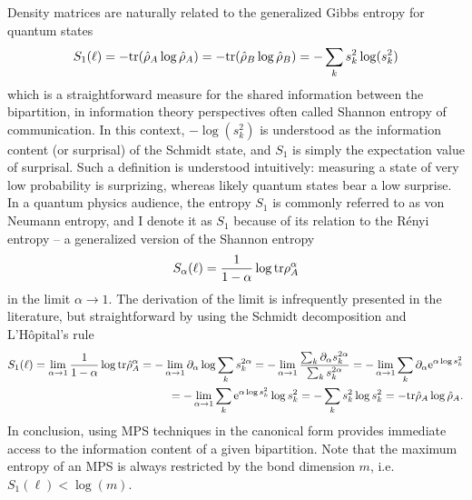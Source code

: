 Density matrices are naturally related to the generalized Gibbs entropy for quantum states
\begin{align}
    S_1(\ell) = -{\rm tr}(\hat\rho_A\log\hat\rho_A) = -{\rm tr}(\hat\rho_B\log\hat\rho_B) = -\sum_k s^2_k\log(s^2_k)
\end{align}
which is a straightforward measure for the shared information between the bipartition, in information theory perspectives often called Shannon entropy of communication.
In this context, $-\log(s^2_k)$ is understood as the information content (or surprisal) of the Schmidt state, and $S_1$ is simply the expectation value of surprisal.
Such a definition is understood intuitively: measuring a state of very low probability is surprizing, whereas likely quantum states bear a low surprise.
In a quantum physics audience, the entropy $S_1$ is commonly referred to as von Neumann entropy, and I denote it as $S_1$ because of its relation to the Rényi entropy -- a generalized version of the Shannon entropy
\begin{align}
    S_\alpha(\ell) = \frac{1}{1-\alpha}\log{\rm tr}\rho^\alpha_A
\end{align}
in the limit $\alpha\rightarrow1$.
The derivation of the limit is infrequently presented in the literature, but straightforward by using the Schmidt decomposition and L'Hôpital's rule
\begin{align}
    S_1(\ell)
    =
    \lim_{\alpha\rightarrow1}\frac1{1-\alpha}\log{\rm tr}\hat\rho_A^\alpha
    =
    -\lim_{\alpha\rightarrow1}\partial_\alpha\log\sum_k s_k^{2\alpha}
    =
    -\lim_{\alpha\rightarrow1}\frac{\sum_k\partial_\alpha s_k^{2\alpha}}{\sum_k s_k^{2\alpha}}
    =
    -\lim_{\alpha\rightarrow1}\sum_k \partial_{\alpha}\mathrm e^{\alpha\log s_k^2}
    \\
    =
    -\lim_{\alpha\rightarrow1}\sum_k \mathrm e^{\alpha\log s_k^2}\log s_k^2
    =
    -\sum_k s_k^2\log s_k^2
    =
    -{\rm tr} \hat\rho_A\log\hat\rho_A.
\end{align}
In conclusion, using MPS techniques in the canonical form provides immediate access to the information content of a given bipartition.
Note that the maximum entropy of an MPS is always restricted by the bond dimension $m$, i.e. $S_1(\ell)<\log(m)$.
%
%

